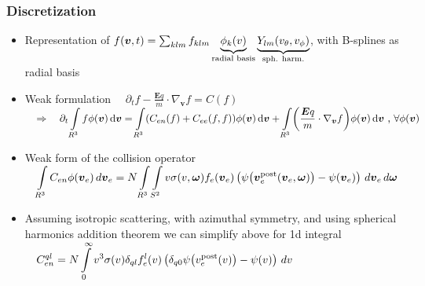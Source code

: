 \documentclass[mathserif, aspectratio=169]{beamer}
\newcommand{\ud}{\,\mathrm{d}}
\newcommand{\vect}[1]{\boldsymbol{#1}}
\newcommand{\of}[1]{\mleft( #1 \mright)}
\newcommand{\myint}{\int\limits}
\newcommand{\diff}[1]{\, d#1}
\begin{document}
\begin{frame}
	\frametitle{Discretization}
	\small
	\begin{itemize}
		\item Representation of $f\of{\vect{v},t} = \sum_{klm} f_{klm} \underbrace{\phi_k\of{v}}_{\text{radial basis}} \underbrace{Y_{lm}\of{v_\theta, v_\phi}}_{\tiny\text{sph. harm.}}$, with B-splines as radial basis 
		\item Weak formulation
			$
			\displaystyle
			\quad
			\partial_t f - \frac{\vect{E} q}{m} \cdot \nabla_{\vect{v}}f = C(f)
			\quad $ \\
			$
			\displaystyle
			\quad
			\Rightarrow \quad
			\partial_t \myint_{R^3} f \phi\of{\vect{v}} \ud \vect{v} = 
			\myint_{R^3} \of{C_{en}(f) + C_{ee}(f,f)} \phi\of{\vect{v}} \ud \vect{v} + \myint_{R^3} \of{\frac{\vect{E} q}{m} \cdot \nabla_{\vect{v}} f} \phi(\vect{v}) \ud \vect{v}\text{ , } 
			\forall \phi(\vect{v})$
		\item Weak form of the collision operator \\
			$
			\displaystyle
			\quad 
			\myint_{R^3} C_{en} \phi\of{\vect{v}_e} \diff{\vect{v}_e} 
			=
			N \myint_{R^3} \myint_{S^2} 
			v\sigma(v,\vect{\omega})
			f_e\of{\vect{v}_e}
			\left(
			\psi\of{\vect{v}_e^\text{post}\of{\vect{v}_e, \vect{\omega}}} 
			- \psi\of{\vect{v}_e} 
			\right)
			\diff{\vect{v}_e} \diff{\vect{\omega}}
			$
		\item Assuming isotropic scattering, with azimuthal symmetry, and using spherical harmonics addition theorem we can simplify above for 1d integral\\
		$
		\displaystyle
		\quad 
		C_{en}^{ql} 
		=
		N \myint_{0}^{\infty} 
		v^3\sigma(v)\delta_{ql}
		f_e^{l}\of{v}
		\left(
		\delta_{q0}\psi\of{v_e^\text{post}\of{v}} - \psi\of{v} 
		\right)
		\diff{v} 
		$ 
	\end{itemize}
\end{frame}
\end{document}
